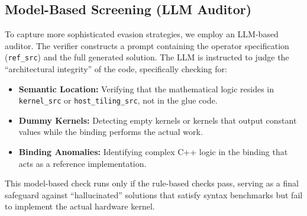 \documentclass{article} %
\theoremstyle{definition}
\theoremstyle{remark}
\begin{document}
  \subsection{Model-Based Screening (LLM Auditor)}
  To capture more sophisticated evasion strategies, we employ an LLM-based auditor. The verifier constructs a prompt containing the operator specification (\texttt{ref\_src}) and the full generated solution. The LLM is instructed to judge the ``architectural integrity'' of the code, specifically checking for:
  \begin{itemize}
      \item \textbf{Semantic Location:} Verifying that the mathematical logic resides in \texttt{kernel\_src} or \texttt{host\_tiling\_src}, not in the glue code.
      \item \textbf{Dummy Kernels:} Detecting empty kernels or kernels that output constant values while the binding performs the actual work.
      \item \textbf{Binding Anomalies:} Identifying complex C++ logic in the binding that acts as a reference implementation.
  \end{itemize}
  This model-based check runs only if the rule-based checks pass, serving as a final safeguard against ``hallucinated'' solutions that satisfy syntax benchmarks but fail to implement the actual hardware kernel.
\end{document}
